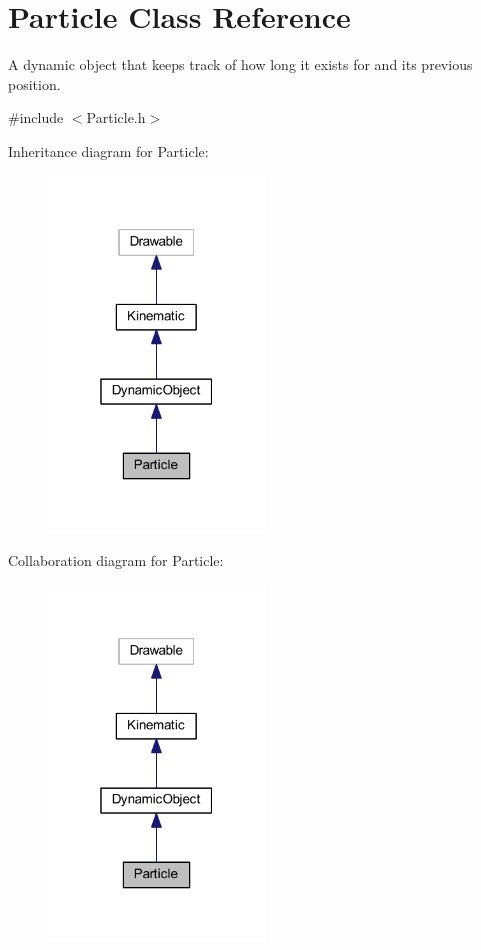 \hypertarget{class_particle}{}\section{Particle Class Reference}
\label{class_particle}


A dynamic object that keeps track of how long it exists for and its previous position.  




{\ttfamily \#include $<$Particle.\+h$>$}



Inheritance diagram for Particle\+:\nopagebreak
\begin{figure}[H]
\begin{center}
\leavevmode
\includegraphics[width=163pt]{class_particle__inherit__graph}
\end{center}
\end{figure}


Collaboration diagram for Particle\+:\nopagebreak
\begin{figure}[H]
\begin{center}
\leavevmode
\includegraphics[width=163pt]{class_particle__coll__graph}
\end{center}
\end{figure}
